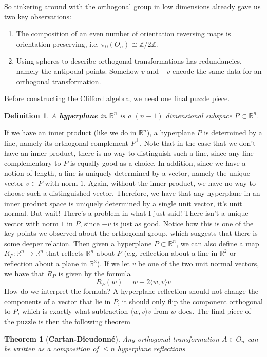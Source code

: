 \documentclass{article}
\newcommand{\R}{\mathbb{R}}
\newcommand{\Z}{\mathbb{Z}}
\newtheorem{definition}{Definition}[subsection]
\newtheorem{theorem}{Theorem}[section]
\begin{document}
So tinkering around with the orthogonal group in low dimensions already gave us two key observations:
\begin{enumerate}
\item The composition of an even number of orientation reversing maps is orientation preserving, i.e. $\pi_0(O_n) \cong \Z/2\Z$.
\item Using spheres to describe orthogonal transformations has redundancies, namely the antipodal points. Somehow $v$ and $-v$ encode the same data for an orthogonal transformation.
\end{enumerate}
Before constructing the Clifford algebra, we need one final puzzle piece.
\begin{definition}
A \textbf{hyperplane} in $\R^n$ is a $(n-1)$ dimensional subspace $P \subset \R^n$.
\end{definition}
If we have an inner product (like we do in $\R^n$), a hyperplane $P$ is determined by a line, namely its orthogonal complement $P^\perp$. Note that in the case that we don't have an inner product, there is no way to distinguish such a line, since any line complementary to $P$ is equally good as a choice. In addition, since we have a notion of length, a line is uniquely determined by a vector, namely the unique vector $v \in P$ with norm $1$. Again, without the inner product, we have no way to choose such a distinguished vector. Therefore, we have that any hyperplane in an inner product space is uniquely determined by a single unit vector, it's unit normal. But wait! There's a problem in what I just said! There isn't a unique vector with norm $1$ in $P$, since $-v$ is just as good. Notice how this is one of the key points we observed about the orthogonal group, which suggests that there is some deeper relation. Then given a hyperplane $P \subset \R^n$, we can also define a map $R_P : \R^n \to \R^n$ that reflects $\R^n$ about $P$ (e.g. reflection about a line in $\R^2$ or reflection about a plane in $\R^3$). If we let $v$ be one of the two unit normal vectors, we have that $R_P$ is given by the formula
$$R_P(w) = w -2\langle w, v \rangle v $$
How do we interpret the formula? A hyperplane reflection should not change the components of a vector that lie in $P$, it should only flip the component orthogonal to $P$, which is exactly what subtraction $\langle w,v \rangle v$ from $w$ does. The final piece of the puzzle is then the following theorem
\begin{theorem}[\textbf{Cartan-Dieudonn\'e}]
Any orthogonal transformation $A \in O_n$ can be written as a composition of $\leq n$ hyperplane reflections
\end{theorem}
\end{document}

